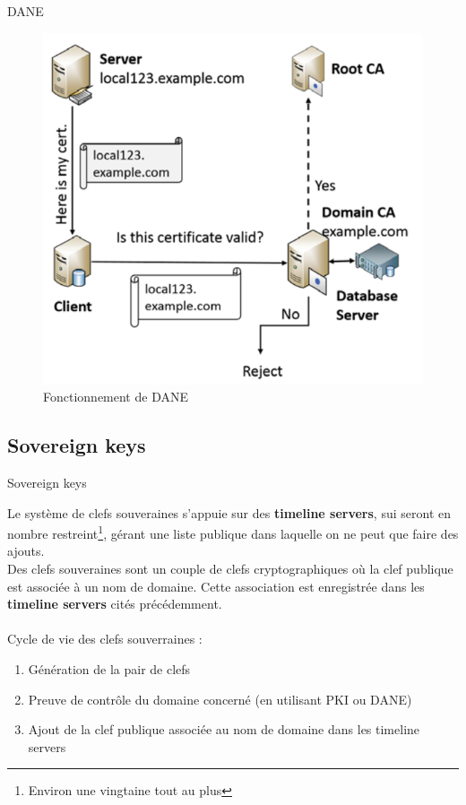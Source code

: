 \documentclass{bredelebeamer}
\begin{document}
\begin{frame}{DANE}

	\begin{figure}
		\centering
		\includegraphics[scale=0.35]{./../danereq.png}
		\caption{Fonctionnement de DANE}
	\end{figure}

\end{frame}

\subsection{Sovereign keys}

\begin{frame}{Sovereign keys}

	Le système de clefs souveraines s'appuie sur des \textbf{timeline servers}, sui seront en nombre restreint\footnote{Environ une vingtaine tout au plus}, gérant une liste publique dans laquelle on ne peut que faire des ajouts.\\
	
	Des clefs souveraines sont un couple de clefs cryptographiques où la clef publique est associée à un nom de domaine. Cette association est enregistrée dans les \textbf{timeline servers} cités précédemment.\\
	\hfill\\
	Cycle de vie des clefs souverraines :
	\begin{enumerate}
		\item Génération de la pair de clefs 
		\item Preuve de contrôle du domaine concerné (en utilisant PKI ou DANE)
		\item Ajout de la clef publique associée au nom de domaine dans les timeline servers
	\end{enumerate}
	
\end{frame}
\end{document}
